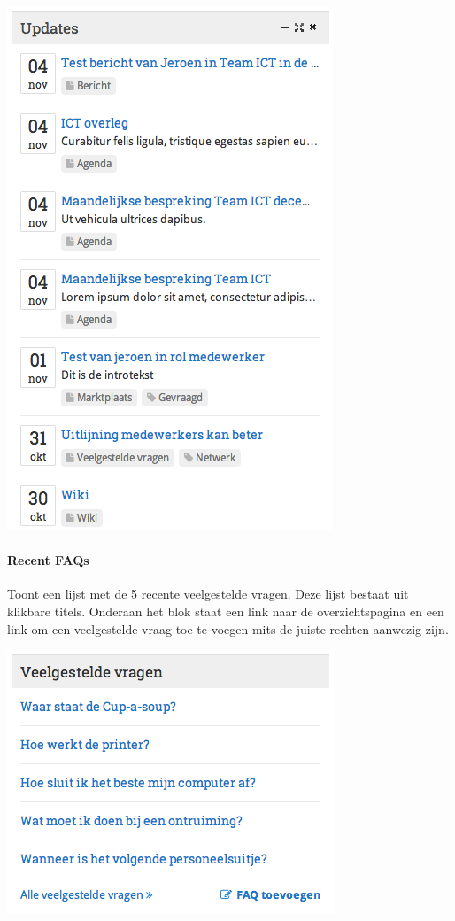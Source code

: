 \begin{center}
	\includegraphics[scale=0.5]{img/blokken/updates.png}
\end{center}

\paragraph{Recent FAQs}

Toont een lijst met de 5 recente veelgestelde vragen. Deze lijst bestaat uit klikbare titels. Onderaan het blok staat een link naar de overzichtspagina en een link om een veelgestelde vraag toe te voegen mits de juiste rechten aanwezig zijn.

\begin{center}
	\includegraphics[scale=0.5]{img/blokken/faq.png}
\end{center}

